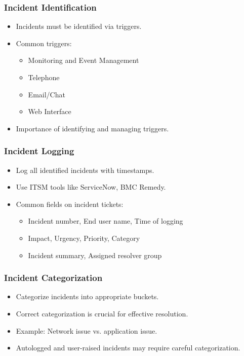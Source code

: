 \documentclass[aspectratio=169, table]{beamer}
\begin{document}
\begin{frame}
	\frametitle{Incident Identification}
	\begin{itemize}
		\item Incidents must be identified via triggers.
		\item Common triggers:
		\begin{itemize}
			\item Monitoring and Event Management
			\item Telephone
			\item Email/Chat
			\item Web Interface
		\end{itemize}
		\item Importance of identifying and managing triggers.
	\end{itemize}
\end{frame}

\begin{frame}
	\frametitle{Incident Logging}
	\begin{itemize}
		\item Log all identified incidents with timestamps.
		\item Use ITSM tools like ServiceNow, BMC Remedy.
		\item Common fields on incident tickets:
		\begin{itemize}
			\item Incident number, End user name, Time of logging
			\item Impact, Urgency, Priority, Category
			\item Incident summary, Assigned resolver group
		\end{itemize}
	\end{itemize}
\end{frame}

\begin{frame}
	\frametitle{Incident Categorization}
	\begin{itemize}
		\item Categorize incidents into appropriate buckets.
		\item Correct categorization is crucial for effective resolution.
		\item Example: Network issue vs. application issue.
		\item Autologged and user-raised incidents may require careful categorization.
	\end{itemize}
\end{frame}
\end{document}
